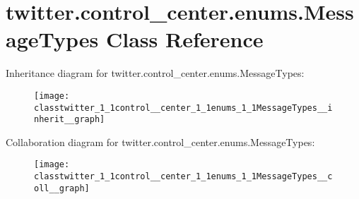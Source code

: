 \hypertarget{classtwitter_1_1control__center_1_1enums_1_1MessageTypes}{}\section{twitter.\+control\+\_\+center.\+enums.\+Message\+Types Class Reference}
\label{classtwitter_1_1control__center_1_1enums_1_1MessageTypes}


Inheritance diagram for twitter.\+control\+\_\+center.\+enums.\+Message\+Types\+:
\nopagebreak
\begin{figure}[H]
\begin{center}
\leavevmode
\texttt{[image: classtwitter\_1\_1control\_\_center\_1\_1enums\_1\_1MessageTypes\_\_inherit\_\_graph]}
\end{center}
\end{figure}


Collaboration diagram for twitter.\+control\+\_\+center.\+enums.\+Message\+Types\+:
\nopagebreak
\begin{figure}[H]
\begin{center}
\leavevmode
\texttt{[image: classtwitter\_1\_1control\_\_center\_1\_1enums\_1\_1MessageTypes\_\_coll\_\_graph]}
\end{center}
\end{figure}

